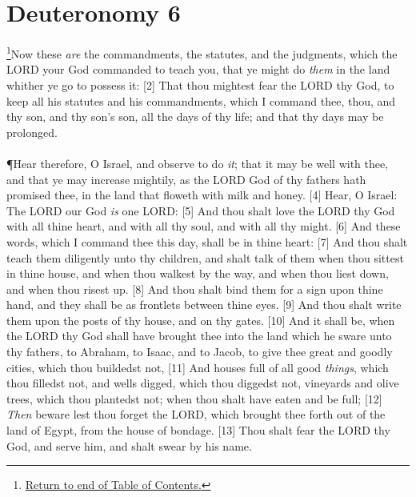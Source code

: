 \chapter{Deuteronomy 6}
\footnote{\textcolor[rgb]{0.00,0.25,0.00}{\hyperlink{DeuteronomyTOC}{Return to end of Table of Contents.}}}\textcolor[rgb]{0.00,0.00,1.00}{Now these \emph{are} the commandments, the statutes, and the judgments, which the LORD your God commanded to teach you, that ye might do \emph{them} in the land whither ye go to possess it:}
[2] \textcolor[rgb]{0.00,0.00,1.00}{That thou mightest fear the LORD thy God, to keep all his statutes and his commandments, which I command thee, thou, and thy son, and thy son's son, all the days of thy life; and that thy days may be prolonged.}\\
\\
\P \textcolor[rgb]{0.00,0.00,1.00}{Hear therefore, O Israel, and observe to do \emph{it}; that it may be well with thee, and that ye may increase mightily, as the LORD God of thy fathers hath promised thee, in the land that floweth with milk and honey.}
[4] \textcolor[rgb]{0.00,0.00,1.00}{Hear, O Israel: The LORD our God \emph{is} one LORD:}
[5] \textcolor[rgb]{0.00,0.00,1.00}{And thou shalt love the LORD thy God with all thine heart, and with all thy soul, and with all thy might.}
[6] \textcolor[rgb]{0.00,0.00,1.00}{And these words, which I command thee this day, shall be in thine heart:}
[7] \textcolor[rgb]{0.00,0.00,1.00}{And thou shalt teach them diligently unto thy children, and shalt talk of them when thou sittest in thine house, and when thou walkest by the way, and when thou liest down, and when thou risest up.}
[8] \textcolor[rgb]{0.00,0.00,1.00}{And thou shalt bind them for a sign upon thine hand, and they shall be as frontlets between thine eyes.}
[9] \textcolor[rgb]{0.00,0.00,1.00}{And thou shalt write them upon the posts of thy house, and on thy gates.}
[10] \textcolor[rgb]{0.00,0.00,1.00}{And it shall be, when the LORD thy God shall have brought thee into the land which he sware unto thy fathers, to Abraham, to Isaac, and to Jacob, to give thee great and goodly cities, which thou buildedst not,}
[11] \textcolor[rgb]{0.00,0.00,1.00}{And houses full of all good \emph{things}, which thou filledst not, and wells digged, which thou diggedst not, vineyards and olive trees, which thou plantedst not; when thou shalt have eaten and be full;}
[12] \textcolor[rgb]{0.00,0.00,1.00}{\emph{Then} beware lest thou forget the LORD, which brought thee forth out of the land of Egypt, from the house of bondage.}
[13] \textcolor[rgb]{0.00,0.00,1.00}{Thou shalt fear the LORD thy God, and serve him, and shalt swear by his name.}
